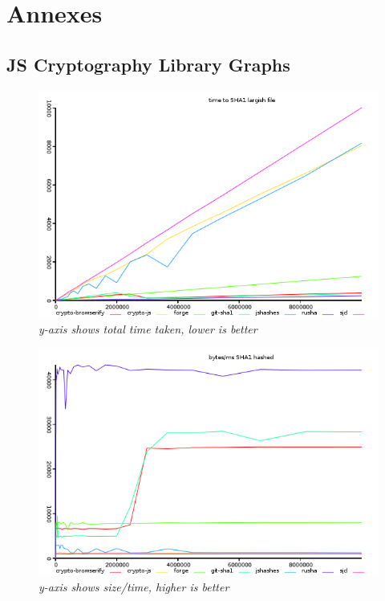 \graphicspath{{./annexes/}} %

\section{Annexes}

\subsection{JS Cryptography Library Graphs}

\begin{figure}
\centering
\includegraphics[scale=0.6]{graphs/hash-sha1.png}
\caption{\small \sl y-axis shows total time taken, lower is better
\label{fig:sha1-file-ms}}  
\end{figure}

\begin{figure}
\centering
\includegraphics[scale=0.6]{graphs/hash-ops-sha1.png}
\caption{\small \sl y-axis shows size/time, higher is better
\label{fig:sha1-hash-ms}}  
\end{figure} 

